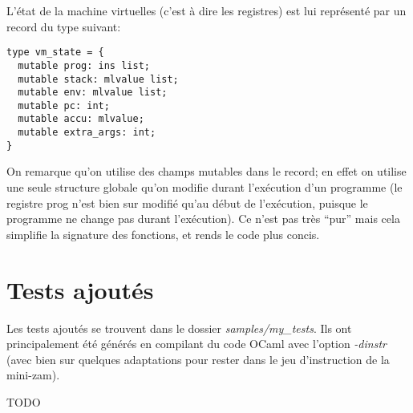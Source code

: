 \documentclass{article}
\begin{document}
L'état de la machine virtuelles (c'est à dire les registres) est lui représenté par un record du type suivant:
\begin{lstlisting}
type vm_state = {
  mutable prog: ins list;
  mutable stack: mlvalue list;
  mutable env: mlvalue list;
  mutable pc: int;
  mutable accu: mlvalue;
  mutable extra_args: int;
}
\end{lstlisting}
On remarque qu'on utilise des champs mutables dans le record; en effet on utilise une seule structure globale qu'on modifie durant l'exécution d'un programme (le registre prog n'est bien sur modifié qu'au début de l'exécution, puisque le programme ne change pas durant l'exécution). Ce n'est pas très ``pur'' mais cela simplifie la signature des fonctions, et rends le code plus concis.

\section{Tests ajoutés}
Les tests ajoutés se trouvent dans le dossier \textit{samples/my\_tests}. Ils ont principalement été générés en compilant du code OCaml avec l'option \textit{-dinstr} (avec bien sur quelques adaptations pour rester dans le jeu d'instruction de la mini-zam).

TODO
\end{document}
